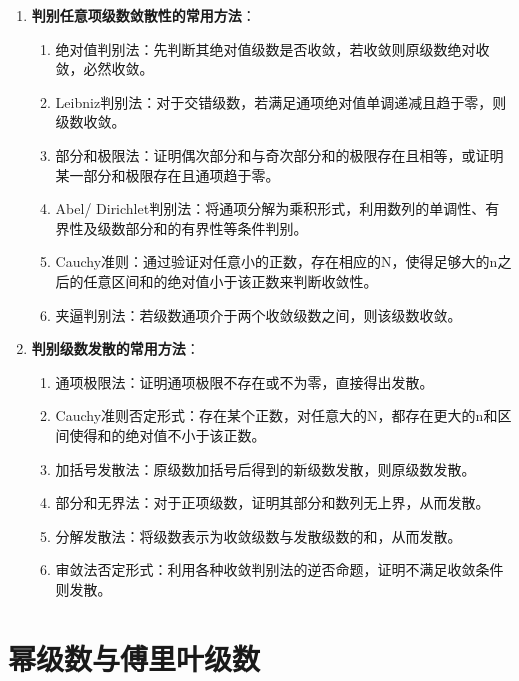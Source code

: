 \documentclass[UTF8]{ctexart}
\theoremstyle{remark}
\begin{document}
\begin{enumerate}
\item \textbf{判别任意项级数敛散性的常用方法}：
\begin{enumerate}
	\item 绝对值判别法：先判断其绝对值级数是否收敛，若收敛则原级数绝对收敛，必然收敛。
	\item Leibniz判别法：对于交错级数，若满足通项绝对值单调递减且趋于零，则级数收敛。
	\item 部分和极限法：证明偶次部分和与奇次部分和的极限存在且相等，或证明某一部分和极限存在且通项趋于零。
	\item Abel/ Dirichlet判别法：将通项分解为乘积形式，利用数列的单调性、有界性及级数部分和的有界性等条件判别。
	\item Cauchy准则：通过验证对任意小的正数，存在相应的N，使得足够大的n之后的任意区间和的绝对值小于该正数来判断收敛性。
	\item 夹逼判别法：若级数通项介于两个收敛级数之间，则该级数收敛。
\end{enumerate}

\item \textbf{判别级数发散的常用方法}：
\begin{enumerate}
	\item 通项极限法：证明通项极限不存在或不为零，直接得出发散。
	\item Cauchy准则否定形式：存在某个正数，对任意大的N，都存在更大的n和区间使得和的绝对值不小于该正数。
	\item 加括号发散法：原级数加括号后得到的新级数发散，则原级数发散。
	\item 部分和无界法：对于正项级数，证明其部分和数列无上界，从而发散。
	\item 分解发散法：将级数表示为收敛级数与发散级数的和，从而发散。
	\item 审敛法否定形式：利用各种收敛判别法的逆否命题，证明不满足收敛条件则发散。
\end{enumerate}
\end{enumerate}

\section{幂级数与傅里叶级数}
\end{document}
